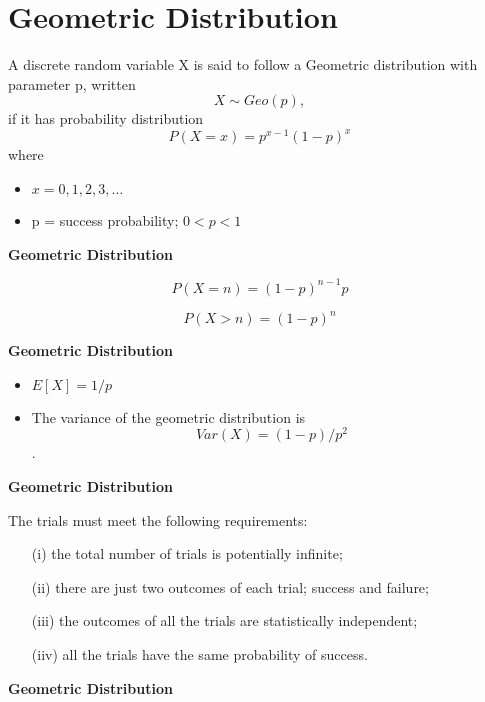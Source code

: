 \documentclass[]{report}
\begin{document}
\section{Geometric Distribution}

A discrete random variable X is said to follow a Geometric distribution with parameter p, written \[X \sim Geo(p),\] if it has probability distribution
\[P(X=x) = p^{x-1}(1-p)^x\]
where
\begin{itemize}
\item $x = 0, 1, 2, 3, \ldots$
\item p = success probability; $0 < p < 1$
\end{itemize}



\noindent \textbf{Geometric Distribution}

\[ P(X = n) = (1-p)^{n-1}p \]

\[ P(X > n) = (1-p)^n \]




\noindent \textbf{Geometric Distribution}

\begin{itemize}
\item $ E[X] = 1/p $

\item The variance of the geometric distribution is 
\[Var(X) = (1-p)/p^2\].

\end{itemize}



\noindent \textbf{Geometric Distribution}

The trials must meet the following requirements:

\begin{itemize}
\item[(i)] the total number of trials is potentially infinite;
\item[(ii)] there are just two outcomes of each trial; success and failure;
\item[(iii)] the outcomes of all the trials are statistically independent;
\item[(iiv)] all the trials have the same probability of success.
\end{itemize}



\noindent \textbf{Geometric Distribution}
\end{document}
